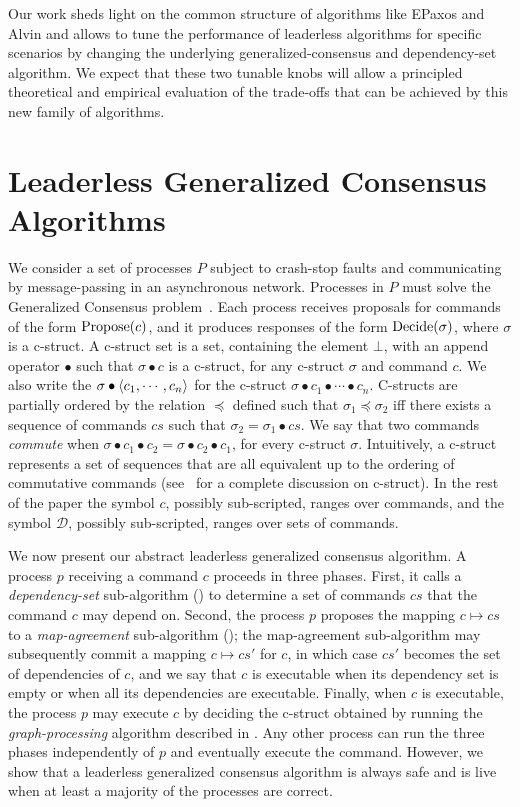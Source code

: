 Our work sheds light on the common structure of algorithms like EPaxos and Alvin and allows to tune the performance of leaderless algorithms for specific scenarios by changing the underlying generalized-consensus and dependency-set algorithm. 
We expect that these two tunable knobs will allow a principled theoretical and empirical evaluation of the trade-offs that can be achieved by this new family of algorithms.

\section{Leaderless Generalized Consensus Algorithms}

We consider a set of processes $P$ subject to crash-stop faults and communicating by message-passing in an asynchronous network. Processes in $P$ must solve the Generalized Consensus problem~\cite{Lamport05GeneralizeConsensus}. Each process receives proposals for commands of the form $\operatorname{Propose}(c)$, and it produces responses of the form $\operatorname{Decide}(\sigma)$, where $\sigma$ is a c-struct. A c-struct set is a set, containing the element $\bot$, with an append operator $\bullet$ such that $\sigma \bullet c$ is a c-struct, for any c-struct $\sigma$ and command $c$. 
We also write the $\sigma\bullet\left\langle c_1,\cdots,c_n\right\rangle$ for the c-struct $\sigma\bullet c_1\bullet\cdots\bullet c_n$. 
C-structs are partially ordered by the relation $\preceq$ defined such that $\sigma_1\preceq\sigma_2$ iff there exists a sequence of commands $cs$ such that $\sigma_2=\sigma_1\bullet cs$.
We say that two commands \textit{commute} when $\sigma\bullet c_1\bullet c_2 =  \sigma\bullet c_2\bullet c_1 $, for every c-struct $\sigma$. Intuitively, a c-struct represents a set of sequences that are all equivalent up to the ordering of commutative commands (see~\cite{Lamport05GeneralizeConsensus} for a complete discussion on c-struct). 
In the rest of the paper the symbol $c$, possibly sub-scripted, ranges over commands, and the symbol $\mathcal{D}$, possibly sub-scripted, ranges over sets of commands.

We now present our abstract leaderless generalized consensus algorithm.
A process $p$ receiving a command $c$ proceeds in three phases. First, it calls a \textit{dependency-set} sub-algorithm () to determine a set of commands $cs$ that the command $c$ may depend on. Second, the process $p$ proposes the mapping  $c\mapsto cs$ to a \textit{map-agreement} sub-algorithm (); the map-agreement sub-algorithm may subsequently commit a mapping $c\mapsto cs'$ for $c$, in which case $cs'$ becomes the set of dependencies of $c$, and we say that $c$ is executable when its dependency set is empty or when all its dependencies are executable. 
Finally, when $c$ is executable, the process $p$ may execute $c$ by deciding the c-struct obtained by running the \emph{graph-processing} algorithm described in .
Any other process can run the three phases independently of $p$ and eventually execute the command.
However, we show that a leaderless  generalized consensus algorithm is always safe and is live when at least a majority of the processes are correct.

